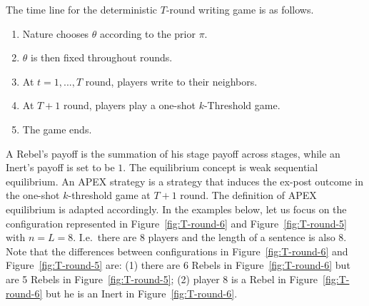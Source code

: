 \documentclass[12pt,letter]{article}
\theoremstyle{definition}
\theoremstyle{remark}
\theoremstyle{claim}
\begin{document}
The time line for the deterministic $T$-round writing game is as follows.
\begin{enumerate}
\item Nature chooses $\theta$ according to the prior $\pi$.
\item $\theta$ is then fixed throughout rounds.
\item At $t=1,...,T$ round, players write to their neighbors. 
\item At $T+1$ round, players play a one-shot $k$-Threshold game.
\item The game ends.
\end{enumerate}
A Rebel's payoff is the summation of his stage payoff across stages, while an Inert's payoff is set to be $1$. The equilibrium concept is weak sequential equilibrium. An APEX strategy is a strategy that induces the ex-post outcome in the one-shot $k$-threshold game at $T+1$ round. The definition of APEX equilibrium is adapted accordingly. In the examples below, let us focus on the configuration represented in Figure~\ref{fig:T-round-6} and Figure~\ref{fig:T-round-5} with $n=L=8$. I.e.~there are 8 players and the length of a sentence is also 8. Note that the differences between configurations in Figure~\ref{fig:T-round-6} and Figure~\ref{fig:T-round-5} are: (1) there are 6 Rebels in Figure~\ref{fig:T-round-6} but are 5 Rebels in Figure~\ref{fig:T-round-5}; (2) player 8 is a Rebel in Figure~\ref{fig:T-round-6} but he is an Inert in Figure~\ref{fig:T-round-6}.
\end{document}
